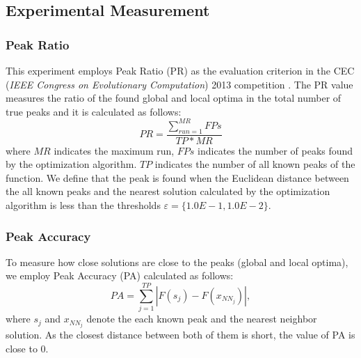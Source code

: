 
\subsection{Experimental Measurement}
\subsubsection{Peak Ratio}
This experiment employs Peak Ratio (PR) \cite{CDE} as the evaluation criterion in the CEC (\textit{IEEE Congress on Evolutionary Computation}) 2013 competition \cite{cec2013}. The PR value measures the ratio of the found global and local optima in the total number of true peaks and it is calculated as follows: 
\begin{equation}
\label{eq:PR}
PR=\frac{\sum_{run=1}^{MR}FPs}{TP*MR}
\end{equation}
 where ${MR}$ indicates the maximum run, ${FPs}$ indicates the number of peaks found by the optimization algorithm. ${TP}$ indicates the number of all known peaks of the function. We define that the peak is found when the Euclidean distance between the all known peaks and the nearest solution calculated by the optimization algorithm is less than the thresholds $\varepsilon = \{1.0E-1, 1.0E-2\}$.

\subsubsection{Peak Accuracy}
To measure how close solutions are close to the peaks (global and local optima), we employ Peak Accuracy (PA) \cite{CDE} calculated as follows:
\begin{equation}
PA=\sum_{j=1}^{TP}|F(s_j)-F(x_{NN_j})|,
\end{equation}
where $s_j$ and $x_{NN_j}$ denote the each known peak and the nearest neighbor solution. As the closest distance between both of them is short, the value of PA is close to 0. 

